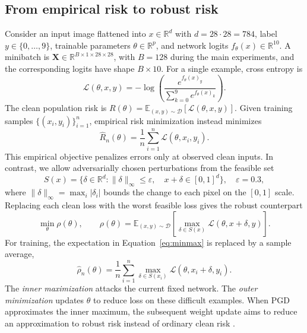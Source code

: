\documentclass[11pt,a4paper]{article}
\newcommand{\R}{\mathbb{R}}
\newcommand{\E}{\mathbb{E}}
\newcommand{\vect}[1]{\mathbf{#1}}
\begin{document}
\subsection{From empirical risk to robust risk}
Consider an input image flattened into $x\in\R^{d}$ with $d=28\cdot28=784$, label $y\in\{0,\ldots,9\}$, trainable parameters $\theta\in\R^p$, and network logits $f_\theta(x)\in\R^{10}$. A minibatch is $\vect{X}\in\R^{B\times1\times28\times28}$, with $B=128$ during the main experiments, and the corresponding logits have shape $B\times10$. For a single example, cross entropy is
\begin{equation}
\mathcal{L}(\theta,x,y)=-\log\left(\frac{e^{f_\theta(x)_y}}{\sum_{k=0}^{9}e^{f_\theta(x)_k}}\right).
\label{eq:ce}
\end{equation}
The clean population risk is $R(\theta)=\E_{(x,y)\sim\mathcal{D}}[\mathcal{L}(\theta,x,y)]$. Given training samples $\{(x_i,y_i)\}_{i=1}^{n}$, empirical risk minimization instead minimizes
\begin{equation}
\widehat R_n(\theta)=\frac{1}{n}\sum_{i=1}^{n}\mathcal{L}(\theta,x_i,y_i).
\label{eq:erm}
\end{equation}
This empirical objective penalizes errors only at observed clean inputs. In contrast, we allow adversarially chosen perturbations from the feasible set
\begin{equation}
S(x)=\{\delta\in\R^d:\|\delta\|_\infty\leq\varepsilon,\quad x+\delta\in[0,1]^d\},\quad\varepsilon=0.3,
\label{eq:set}
\end{equation}
where $\|\delta\|_\infty=\max_i|\delta_i|$ bounds the change to each pixel on the $[0,1]$ scale. Replacing each clean loss with the worst feasible loss gives the robust counterpart
\begin{equation}
\min_\theta \rho(\theta),\qquad \rho(\theta)=
\E_{(x,y)\sim\mathcal D}\!\left[\max_{\delta\in S(x)}\mathcal{L}(\theta,x+\delta,y)\right].
\label{eq:minmax}
\end{equation}
For training, the expectation in Equation~\ref{eq:minmax} is replaced by a sample average,
\begin{equation}
\widehat\rho_n(\theta)=\frac{1}{n}\sum_{i=1}^{n}\max_{\delta\in S(x_i)}\mathcal{L}(\theta,x_i+\delta,y_i).
\end{equation}
The \emph{inner maximization} attacks the current fixed network. The \emph{outer minimization} updates $\theta$ to reduce loss on these difficult examples. When PGD approximates the inner maximum, the subsequent weight update aims to reduce an approximation to robust risk instead of ordinary clean risk \citep{madry2018towards}.
\end{document}
